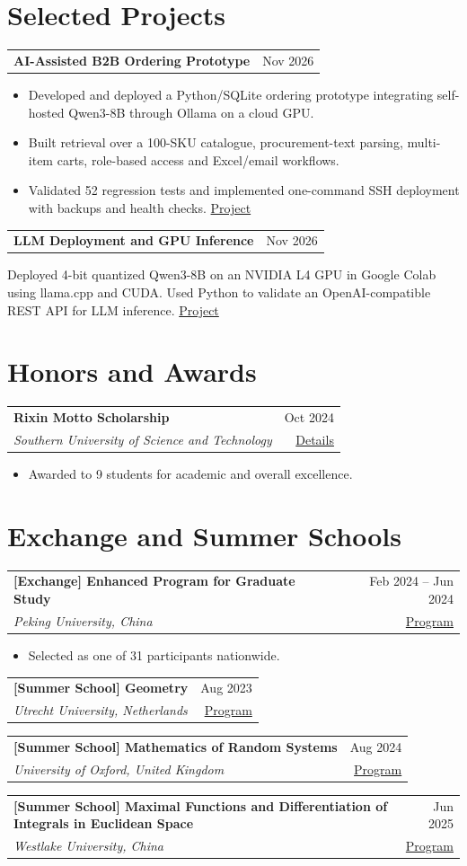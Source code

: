 \documentclass[a4paper,11pt]{article}
\makeatletter
\newcommand{\cventry}[4]{\par\addvspace{3pt}\begin{tabularx}{\linewidth}{@{}>{\raggedright\arraybackslash}X@{\hspace{1em}}r@{}}\textbf{#1} & #2 \\ \textit{#3} & #4\end{tabularx}\par}
\newcommand{\projectentry}[2]{\par\addvspace{3pt}\begin{tabularx}{\linewidth}{@{}>{\raggedright\arraybackslash}X@{\hspace{1em}}r@{}}\textbf{#1} & #2\end{tabularx}\par}
\makeatother
\begin{document}
\section{Selected Projects}
\projectentry{AI-Assisted B2B Ordering Prototype}{Nov 2026}
\begin{itemize}
\item Developed and deployed a Python/SQLite ordering prototype integrating self-hosted Qwen3-8B through Ollama on a cloud GPU.
\item Built retrieval over a 100-SKU catalogue, procurement-text parsing, multi-item carts, role-based access and Excel/email workflows.
\item Validated 52 regression tests and implemented one-command SSH deployment with backups and health checks. \href{https://jinghua-xi.github.io/projects/hualian-ordering.html}{Project}
\end{itemize}
\projectentry{LLM Deployment and GPU Inference}{Nov 2026}
Deployed 4-bit quantized Qwen3-8B on an NVIDIA L4 GPU in Google Colab using llama.cpp and CUDA. Used Python to validate an OpenAI-compatible REST API for LLM inference. \href{https://jinghua-xi.github.io/projects/qwen-inference.html}{Project}
\section{Honors and Awards}
\cventry{Rixin Motto Scholarship}{Oct 2024}{Southern University of Science and Technology}{\href{https://newshub.sustech.edu.cn/html/202410/45754.html}{Details}}
\begin{itemize}\item Awarded to 9 students for academic and overall excellence.\end{itemize}
\section{Exchange and Summer Schools}
\cventry{[Exchange] Enhanced Program for Graduate Study}{Feb 2024 -- Jun 2024}{Peking University, China}{\href{https://bicmr.pku.edu.cn/content/show/38-305.html}{Program}}
\begin{itemize}\item Selected as one of 31 participants nationwide.\end{itemize}
\cventry{[Summer School] Geometry}{Aug 2023}{Utrecht University, Netherlands}{\href{https://utrechtgeometrycentre.nl/summer-school/}{Program}}
\cventry{[Summer School] Mathematics of Random Systems}{Aug 2024}{University of Oxford, United Kingdom}{\href{https://www.randomsystems-cdt.ac.uk/oxford-berlin-summer-school-mathematics-random-systems}{Program}}
\cventry{[Summer School] Maximal Functions and Differentiation of Integrals in Euclidean Space}{Jun 2025}{Westlake University, China}{\href{https://its.westlake.edu.cn/info/1017/2920.htm}{Program}}
\end{document}
